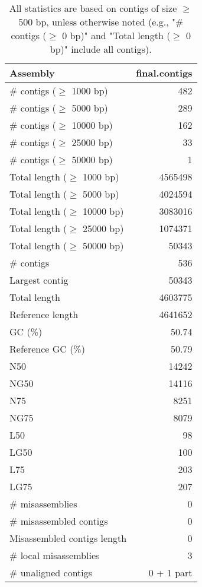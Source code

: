 \documentclass[12pt,a4paper]{article}
\begin{document}
\begin{table}[ht]
\begin{center}
\caption{All statistics are based on contigs of size $\geq$ 500 bp, unless otherwise noted (e.g., "\# contigs ($\geq$ 0 bp)" and "Total length ($\geq$ 0 bp)" include all contigs).}
\begin{tabular}{|l*{1}{|r}|}
\hline
Assembly & final.contigs \\ \hline
\# contigs ($\geq$ 1000 bp) & 482 \\ \hline
\# contigs ($\geq$ 5000 bp) & 289 \\ \hline
\# contigs ($\geq$ 10000 bp) & 162 \\ \hline
\# contigs ($\geq$ 25000 bp) & 33 \\ \hline
\# contigs ($\geq$ 50000 bp) & 1 \\ \hline
Total length ($\geq$ 1000 bp) & 4565498 \\ \hline
Total length ($\geq$ 5000 bp) & 4024594 \\ \hline
Total length ($\geq$ 10000 bp) & 3083016 \\ \hline
Total length ($\geq$ 25000 bp) & 1074371 \\ \hline
Total length ($\geq$ 50000 bp) & 50343 \\ \hline
\# contigs & 536 \\ \hline
Largest contig & 50343 \\ \hline
Total length & 4603775 \\ \hline
Reference length & 4641652 \\ \hline
GC (\%) & 50.74 \\ \hline
Reference GC (\%) & 50.79 \\ \hline
N50 & 14242 \\ \hline
NG50 & 14116 \\ \hline
N75 & 8251 \\ \hline
NG75 & 8079 \\ \hline
L50 & 98 \\ \hline
LG50 & 100 \\ \hline
L75 & 203 \\ \hline
LG75 & 207 \\ \hline
\# misassemblies & 0 \\ \hline
\# misassembled contigs & 0 \\ \hline
Misassembled contigs length & 0 \\ \hline
\# local misassemblies & 3 \\ \hline
\# unaligned contigs & 0 + 1 part \\ \hline

\end{tabular}
\end{center}
\end{table}
\end{document}
